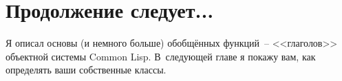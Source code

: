 \section{Продолжение следует...}

Я описал основы (и немного больше) обобщённых функций~-- <<глаголов>> объектной системы
Common Lisp.  В~следующей главе я покажу вам, как определять ваши собственные классы.

